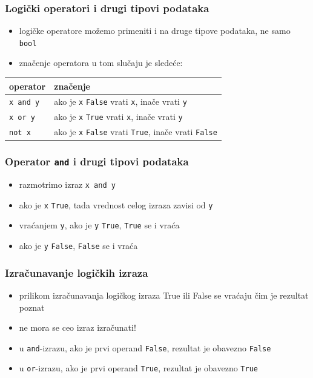 \documentclass[utf8,compress]{beamer}
\begin{document}
\begin{frame}[fragile]
  \frametitle{Logički operatori i drugi tipovi podataka}
  \begin{itemize}
    \item logičke operatore možemo primeniti i na druge tipove podataka, ne samo \texttt{bool}
    \item značenje operatora u tom slučaju je sledeće:
  \end{itemize}
  \begin{center}
    \begin{tabular}{l|l}
      \textbf{operator} & \textbf{značenje} \\ \hline
      \texttt{x and y} & ako je \texttt{x} \texttt{False} vrati \texttt{x}, inače vrati \texttt{y} \\ \hline
      \texttt{x or y} & ako je \texttt{x} \texttt{True} vrati \texttt{x}, inače vrati \texttt{y} \\ \hline
      \texttt{not x} & ako je \texttt{x} \texttt{False} vrati \texttt{True}, inače vrati \texttt{False}
    \end{tabular}
  \end{center}
\end{frame}

\begin{frame}[fragile]
  \frametitle{Operator \texttt{and} i drugi tipovi podataka}
  \begin{itemize}
    \item razmotrimo izraz \texttt{x and y}
    \item ako je \texttt{x} \texttt{True}, tada vrednost celog izraza zavisi od \texttt{y}
    \item vraćanjem \texttt{y}, ako je \texttt{y} \texttt{True}, \texttt{True} se i vraća
    \item ako je \texttt{y} \texttt{False}, \texttt{False} se i vraća
  \end{itemize}
\end{frame}

\begin{frame}[fragile]
  \frametitle{Izračunavanje logičkih izraza}
  \begin{itemize}
    \item prilikom izračunavanja logičkog izraza True ili False se vraćaju čim je rezultat poznat
    \item ne mora se ceo izraz izračunati!
    \item u \texttt{and}-izrazu, ako je prvi operand \texttt{False}, rezultat je obavezno \texttt{False}
    \item u \texttt{or}-izrazu, ako je prvi operand \texttt{True}, rezultat je obavezno \texttt{True}
  \end{itemize}
\end{frame}
\end{document}
